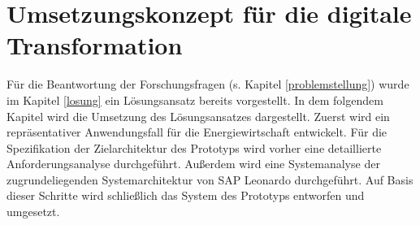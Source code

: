 \section{Umsetzungskonzept für die digitale Transformation}

Für die Beantwortung der Forschungsfragen (s. Kapitel \ref{problemstellung}) wurde im Kapitel \ref{losung} ein Lösungsansatz bereits vorgestellt. In dem folgendem Kapitel wird die Umsetzung des Lösungsansatzes dargestellt. Zuerst wird ein repräsentativer Anwendungsfall für die Energiewirtschaft entwickelt. Für die Spezifikation der Zielarchitektur des Prototyps wird vorher eine detaillierte Anforderungsanalyse durchgeführt. Außerdem wird eine Systemanalyse der zugrundeliegenden Systemarchitektur von SAP Leonardo durchgeführt. Auf Basis dieser Schritte wird schließlich das System des Prototyps entworfen und umgesetzt. 

 
 
 



